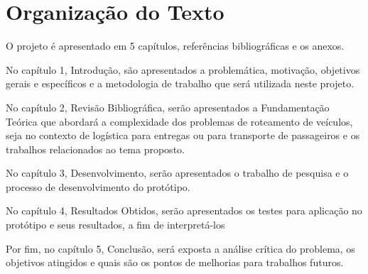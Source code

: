 \section{Organização do Texto}

O projeto é apresentado em 5 capítulos, referências bibliográficas e os anexos.

No capítulo 1, Introdução, são apresentados  a problemática, motivação, objetivos gerais e específicos e a metodologia de trabalho que será utilizada neste projeto.

No capítulo 2, Revisão Bibliográfica, serão apresentados a Fundamentação Teórica que abordará a complexidade dos problemas de roteamento de veículos, seja no contexto de logística para entregas ou para transporte de passageiros e os trabalhos relacionados ao tema proposto. 

No capítulo 3, Desenvolvimento, serão apresentados o trabalho de pesquisa e o processo de desenvolvimento do protótipo.

No capítulo 4, Resultados Obtidos, serão apresentados os testes para aplicação no protótipo e seus resultados, a fim de interpretá-los  

Por fim, no capítulo 5, Conclusão, será exposta a análise crítica do problema, os objetivos atingidos e quais são os pontos de melhorias para trabalhos futuros.